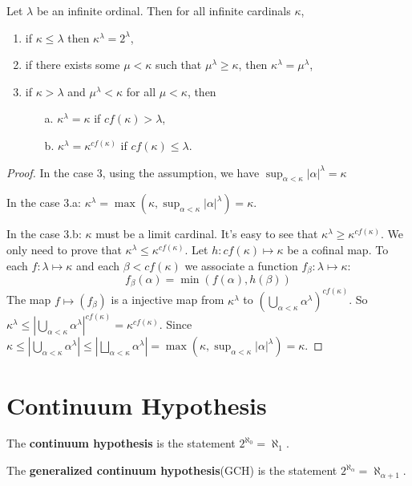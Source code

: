 \documentclass[12pt]{book}
\begin{document}
\begin{theorem}
	Let $\lambda$ be an infinite ordinal. Then for all infinite cardinals $\kappa$,
	\begin{enumerate}
		\item if $\kappa\leq\lambda$ then $\kappa^\lambda=2^\lambda$,
		\item if there exists some $\mu<\kappa$ such that $\mu^\lambda\geq\kappa$, then $\kappa^\lambda=\mu^\lambda$,
		\item if $\kappa>\lambda$ and $\mu^\lambda<\kappa$ for all $\mu<\kappa$, then
		\item[] \begin{enumerate}
					\item[a.] $\kappa^\lambda=\kappa$ if $cf(\kappa)>\lambda$,
					\item[b.] $\kappa^\lambda=\kappa^{cf(\kappa)}$ if $cf(\kappa)\leq\lambda$.
				\end{enumerate}
	\end{enumerate}
\end{theorem}
\begin{proof}
	In the case 3, using the assumption, we have $\sup_{\alpha<\kappa}|\alpha|^\lambda= \kappa$

	In the case 3.a: $\kappa^\lambda=\max(\kappa,\sup_{\alpha<\kappa}|\alpha|^\lambda)=\kappa$.
	
	In the case 3.b: $\kappa$ must be a limit cardinal. It's easy to see that $\kappa^\lambda\geq\kappa^{cf(\kappa)}$. We only need to prove that $\kappa^\lambda\leq\kappa^{cf(\kappa)}$. Let $h:cf(\kappa)\mapsto \kappa$ be a cofinal map. To each $f:\lambda\mapsto\kappa$ and each $\beta<cf(\kappa)$ we associate a function $f_\beta:\lambda\mapsto\kappa:$
	\begin{equation}
		f_\beta(\alpha)=\min(f(\alpha),h(\beta))
	\end{equation}
	The map $f\mapsto (f_\beta)$ is a injective map from $\kappa^\lambda$ to $(\bigcup_{\alpha<\kappa}\alpha^\lambda)^{cf(\kappa)}$. So $\kappa^\lambda\leq|\bigcup_{\alpha<\kappa}\alpha^\lambda|^{cf(\kappa)}=\kappa^{cf(\kappa)}$. Since $\kappa\leq|\bigcup_{\alpha<\kappa}\alpha^\lambda|\leq|\bigsqcup_{\alpha<\kappa}\alpha^\lambda|=\max(\kappa,\sup_{\alpha<\kappa}|\alpha|^\lambda)=\kappa$.
\end{proof}
\section{Continuum Hypothesis}
\begin{axiom}
	The {\bf continuum hypothesis} is the statement $2^{\aleph_0}=\aleph_1$.
\end{axiom}
\begin{axiom}
	The {\bf generalized continuum hypothesis}(GCH) is the statement $2^{\aleph_\alpha}=\aleph_{\alpha+1}$.
\end{axiom}
\end{document}

